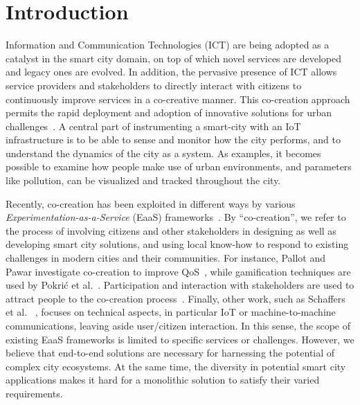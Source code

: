 
\section{Introduction}
\label{sec:intro}

Information and Communication Technologies (ICT) are being adopted as a catalyst in the smart city domain, on top of which novel services are developed and legacy ones are evolved. In addition, the pervasive presence of ICT allows service providers and stakeholders to directly interact with citizens to continuously improve services in a co-creative manner. This co-creation approach permits the rapid deployment and adoption of innovative solutions for urban challenges~\cite{nasrawi}. A central part of instrumenting a smart-city with an IoT infrastructure is to be able to sense and monitor how the city performs, and to understand the dynamics of the city as a system. As examples, it becomes possible to examine how people make use of urban environments, and parameters like pollution, can be visualized and tracked throughout the city.

Recently, co-creation has been exploited in different ways by various \textit{Experimentation-as-a-Service} (EaaS) frameworks~\cite{vermesan2015building}. By ``co-creation'', we refer to the process of involving citizens and other stakeholders in designing as well as developing smart city solutions, and using local know-how to respond to existing challenges in modern cities and their communities.
For instance, Pallot and Pawar investigate co-creation to improve QoS~\cite{pallot}, while gamification techniques are used by Pokrić et al.~\cite{pokric}. Participation and interaction with stakeholders are used to attract people to the co-creation process~\cite{phuluwa, celino, gozard}. Finally, other work, such as Schaffers et al. ~\cite{schaffers2011}, focuses on technical aspects, in particular IoT or machine-to-machine communications, leaving aside user/citizen interaction.  In this sense, the scope of existing EaaS frameworks is limited to specific services or challenges. However, we believe that end-to-end solutions are necessary for harnessing the potential of complex city ecosystems. At the same time, the diversity in potential smart city applications makes it hard for a monolithic solution to satisfy their varied requirements. 

